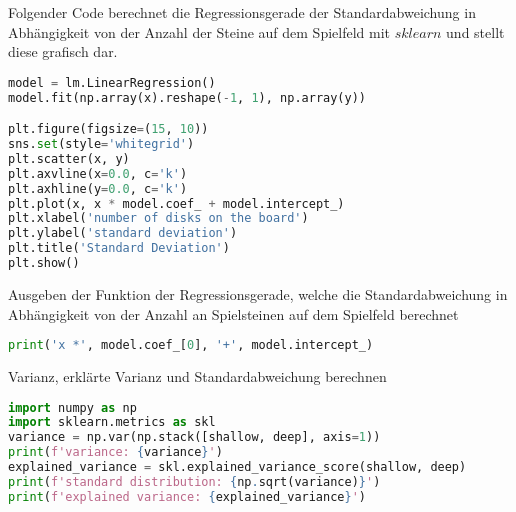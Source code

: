 Folgender Code berechnet die Regressionsgerade der Standardabweichung in
Abhängigkeit von der Anzahl der Steine auf dem Spielfeld mit \(sklearn\)
und stellt diese grafisch dar.

\begin{lstlisting}[language=Python]
model = lm.LinearRegression()
model.fit(np.array(x).reshape(-1, 1), np.array(y))

plt.figure(figsize=(15, 10))
sns.set(style='whitegrid')
plt.scatter(x, y)
plt.axvline(x=0.0, c='k')
plt.axhline(y=0.0, c='k')
plt.plot(x, x * model.coef_ + model.intercept_)
plt.xlabel('number of disks on the board')
plt.ylabel('standard deviation')
plt.title('Standard Deviation')
plt.show()
\end{lstlisting}

Ausgeben der Funktion der Regressionsgerade, welche die
Standardabweichung in Abhängigkeit von der Anzahl an Spielsteinen auf
dem Spielfeld berechnet

\begin{lstlisting}[language=Python]
print('x *', model.coef_[0], '+', model.intercept_)
\end{lstlisting}

Varianz, erklärte Varianz und Standardabweichung berechnen

\begin{lstlisting}[language=Python]
import numpy as np
import sklearn.metrics as skl
variance = np.var(np.stack([shallow, deep], axis=1))
print(f'variance: {variance}')
explained_variance = skl.explained_variance_score(shallow, deep)
print(f'standard distribution: {np.sqrt(variance)}')
print(f'explained variance: {explained_variance}')
\end{lstlisting}

\begin{lstlisting}[language=Python]
\end{lstlisting}
